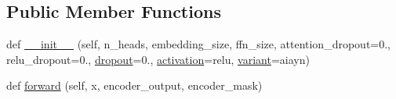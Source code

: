 \subsection*{Public Member Functions}
\begin{DoxyCompactItemize}
\item 
def \hyperlink{classparlai_1_1agents_1_1transformer_1_1modules_1_1TransformerDecoderLayer_ad893ac51805fd662173f777c91b2cca4}{\+\_\+\+\_\+init\+\_\+\+\_\+} (self, n\+\_\+heads, embedding\+\_\+size, ffn\+\_\+size, attention\+\_\+dropout=0., relu\+\_\+dropout=0., \hyperlink{classparlai_1_1agents_1_1transformer_1_1modules_1_1TransformerDecoderLayer_aba87c66e402b0cfdf196872c3f038d43}{dropout}=0., \hyperlink{classparlai_1_1agents_1_1transformer_1_1modules_1_1TransformerDecoderLayer_a33276633e128020853db98128f1d93c3}{activation}=\textquotesingle{}relu\textquotesingle{}, \hyperlink{classparlai_1_1agents_1_1transformer_1_1modules_1_1TransformerDecoderLayer_a94a9a714a2585fd6a675a08643e3ce6b}{variant}=\textquotesingle{}aiayn\textquotesingle{})
\item 
def \hyperlink{classparlai_1_1agents_1_1transformer_1_1modules_1_1TransformerDecoderLayer_ad0a63d90190682d0f9ff325fcf60f426}{forward} (self, x, encoder\+\_\+output, encoder\+\_\+mask)
\end{DoxyCompactItemize}
